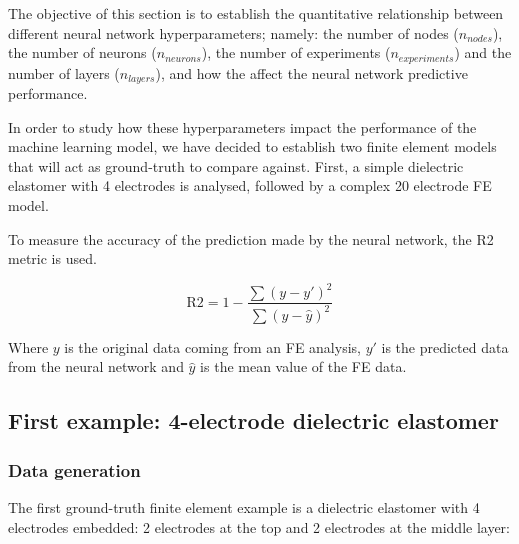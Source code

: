 The objective of this section is to establish the quantitative relationship between different neural network hyperparameters; namely: the number of nodes ($n_{nodes}$), the number of neurons ($n_{neurons}$), the number of experiments ($n_{experiments}$) and the number of layers ($n_{layers}$), and how the affect the neural network predictive performance. 

In order to study how these hyperparameters impact the performance of the machine learning model, we have decided to establish two finite element models that will act as ground-truth to compare against. First, a simple dielectric elastomer with 4 electrodes is analysed, followed by a complex 20 electrode FE model. 

To measure the accuracy of the prediction made by the neural network, the R2 metric is used. 

\begin{equation}
  \mbox{R2} = 1 - \dfrac{\sum ( y - y')^2}{\sum (y - \hat{y})^2}
  \label{eq:R2_measurement}
\end{equation}


Where $y$ is the original data coming from an FE analysis, $y'$ is the predicted data from the neural network and $\hat{y}$ is the mean value of the FE data.

\subsection{First example: 4-electrode dielectric elastomer}

\subsubsection{Data generation}

The first ground-truth finite element example is a dielectric elastomer with 4 electrodes embedded: 2 electrodes at the top and 2 electrodes at the middle layer:

